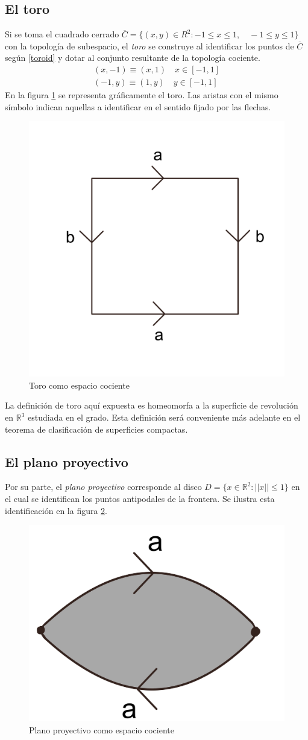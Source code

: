\documentclass[a4paper,11pt,spanish, twoside, leqno]{tfg-uam}
\newcommand*{\reales}{\mathbb{R}}
\theoremstyle{definition}
\begin{document}
\subsection*{El toro}
Si se toma el cuadrado cerrado $ \overline{C} = \{ (x,y) \in R^2: -1\leq x\leq 1,\quad -1\leq y \leq 1  \} $ con la topología de subespacio, el \textit{toro}  se construye al identificar los puntos de  $ \overline{C} $ según  \ref{toroid} y dotar al conjunto resultante de la topología cociente.
\begin{align}\label{toroid}
	(x,-1)\equiv(x,1) \quad x\in [-1,1]  \\
	(-1,y)\equiv(1,y) \quad y\in [-1,1] \nonumber
\end{align}
En la figura \ref{fig:toro expresion canonica} se representa gráficamente el toro. Las aristas con el mismo símbolo indican aquellas a identificar en el sentido fijado por las flechas.
\begin{figure}[h!]
	\centering
	\includegraphics[width=0.2\linewidth]{imagenes/toroplano.png}
	\caption{Toro como espacio cociente}
	\label{fig:toro expresion canonica}
\end{figure} 

La definición de toro aquí expuesta es homeomorfa a la superficie de revolución en $\reales^3$ estudiada en el grado. Esta definición será conveniente más adelante en el teorema de clasificación de superficies compactas.

\subsection*{El plano proyectivo}
Por su parte, el \textit{plano proyectivo} corresponde al disco $ D = \{x\in\mathbb{R}^2: ||x||\leq1 \} $ en el cual se identifican los puntos antipodales de la frontera. Se ilustra esta identificación en la figura \ref{fig:planoproyectivo expresión canónica}.

\begin{figure}[h!]
	\centering
	\includegraphics[width=0.3\linewidth]{imagenes/planop_plano.png}
	\caption{Plano proyectivo como espacio cociente}
	\label{fig:planoproyectivo expresión canónica}
\end{figure} 
\end{document}
